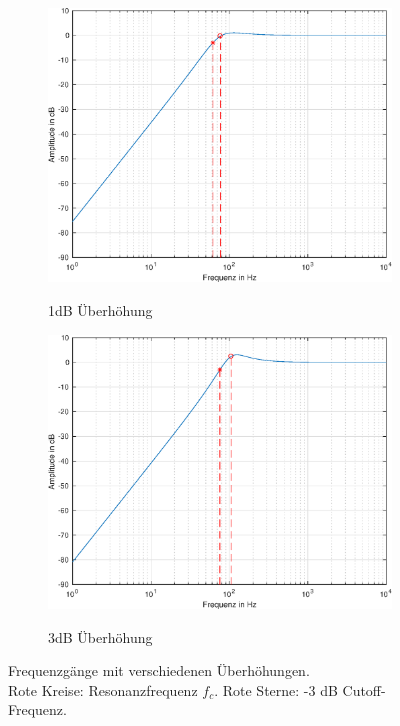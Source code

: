 \begin{figure}[H]
    \centering
    
    \begin{subfigure}{.49\textwidth}
        \centering
        \caption{1dB Überhöhung}
        \includegraphics[width=0.85\linewidth]{Figures/Frequenzgang_1dB.eps}
        \label{Frequenzgang_1dB}
    \end{subfigure}
    \begin{subfigure}{.49\textwidth}
        \centering
        \caption{3dB Überhöhung}
        \includegraphics[width=0.85\linewidth]{Figures/Frequenzgang_3dB.eps}
        \label{Frequenzgang_3dB}
    \end{subfigure}
    \captionsetup{justification=centering}
    \caption{Frequenzgänge mit verschiedenen Überhöhungen.\\Rote Kreise: Resonanzfrequenz $f_c$. Rote Sterne: -3 dB Cutoff-Frequenz.}
    \label{fig:Ueberhoehung}
\end{figure}
